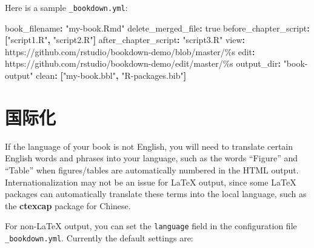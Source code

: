 \documentclass[
  12pt,
]{krantz}
\newenvironment{Shaded}{\begin{snugshade}}{\end{snugshade}}
\newcommand{\AttributeTok}[1]{\textcolor[rgb]{0.77,0.63,0.00}{#1}}
\newcommand{\CharTok}[1]{\textcolor[rgb]{0.31,0.60,0.02}{#1}}
\newcommand{\FunctionTok}[1]{\textcolor[rgb]{0.00,0.00,0.00}{#1}}
\newcommand{\KeywordTok}[1]{\textcolor[rgb]{0.13,0.29,0.53}{\textbf{#1}}}
\newcommand{\StringTok}[1]{\textcolor[rgb]{0.31,0.60,0.02}{#1}}
\theoremstyle{definition}
\theoremstyle{definition}
\theoremstyle{definition}
\theoremstyle{definition}
\theoremstyle{remark}
\begin{document}
Here is a sample \texttt{\_bookdown.yml}:

\begin{Shaded}
\begin{Highlighting}[]
\FunctionTok{book\_filename}\KeywordTok{:}\AttributeTok{ }\StringTok{"my{-}book.Rmd"}
\FunctionTok{delete\_merged\_file}\KeywordTok{:}\AttributeTok{ }\CharTok{true}
\FunctionTok{before\_chapter\_script}\KeywordTok{:}\AttributeTok{ }\KeywordTok{[}\StringTok{"script1.R"}\KeywordTok{,}\AttributeTok{ }\StringTok{"script2.R"}\KeywordTok{]}
\FunctionTok{after\_chapter\_script}\KeywordTok{:}\AttributeTok{ }\StringTok{"script3.R"}
\FunctionTok{view}\KeywordTok{:}\AttributeTok{ https://github.com/rstudio/bookdown{-}demo/blob/master/\%s}
\FunctionTok{edit}\KeywordTok{:}\AttributeTok{ https://github.com/rstudio/bookdown{-}demo/edit/master/\%s}
\FunctionTok{output\_dir}\KeywordTok{:}\AttributeTok{ }\StringTok{"book{-}output"}
\FunctionTok{clean}\KeywordTok{:}\AttributeTok{ }\KeywordTok{[}\StringTok{"my{-}book.bbl"}\KeywordTok{,}\AttributeTok{ }\StringTok{"R{-}packages.bib"}\KeywordTok{]}
\end{Highlighting}
\end{Shaded}

\hypertarget{ux56fdux9645ux5316}{%
\section{国际化}\label{ux56fdux9645ux5316}}

If the language of your book is not English, you will need to translate certain English words and phrases into your language, such as the words ``Figure'' and ``Table'' when figures/tables are automatically numbered in the HTML output. Internationalization may not be an issue for LaTeX output, since some LaTeX packages can automatically translate these terms into the local language, such as the \textbf{ctexcap} package for Chinese.

For non-LaTeX output, you can set the \texttt{language} field in the configuration file \texttt{\_bookdown.yml}. Currently the default settings are:
\end{document}
